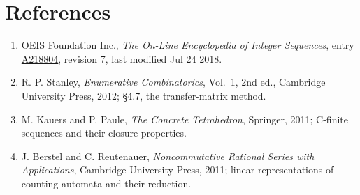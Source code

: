 \documentclass[11pt]{article}
\theoremstyle{definition}
\begin{document}
\section{References}

\begin{enumerate}

\item OEIS Foundation Inc., \emph{The On-Line Encyclopedia of Integer Sequences}, entry \href{https://oeis.org/A218804}{A218804}, revision 7, last modified Jul 24 2018.

\item R. P. Stanley, \emph{Enumerative Combinatorics}, Vol.~1, 2nd ed., Cambridge University Press, 2012; \S4.7, the transfer-matrix method.

\item M. Kauers and P. Paule, \emph{The Concrete Tetrahedron}, Springer, 2011; C-finite sequences and their closure properties.

\item J. Berstel and C. Reutenauer, \emph{Noncommutative Rational Series with Applications}, Cambridge University Press, 2011; linear representations of counting automata and their reduction.

\end{enumerate}
\end{document}
